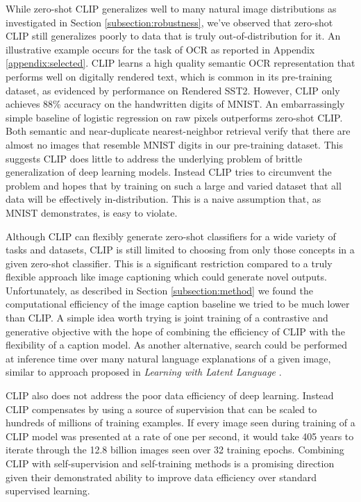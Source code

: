 While zero-shot CLIP generalizes well to many natural image distributions as investigated in Section \ref{subsection:robustness}, we've observed that zero-shot CLIP still generalizes poorly to data that is truly out-of-distribution for it. An illustrative example occurs for the task of OCR as reported in Appendix \ref{appendix:selected}. CLIP learns a high quality semantic OCR representation that performs well on digitally rendered text, which is common in its pre-training dataset, as evidenced by performance on Rendered SST2. However, CLIP only achieves 88\% accuracy on the handwritten digits of MNIST. An embarrassingly simple baseline of logistic regression on raw pixels outperforms zero-shot CLIP. Both semantic and near-duplicate nearest-neighbor retrieval verify that there are almost no images that resemble MNIST digits in our pre-training dataset. This suggests CLIP does little to address the underlying problem of brittle generalization of deep learning models. Instead CLIP tries to circumvent the problem and hopes that by training on such a large and varied dataset that all data will be effectively in-distribution. This is a naive assumption that, as MNIST demonstrates, is easy to violate.

Although CLIP can flexibly generate zero-shot classifiers for a wide variety of tasks and datasets, CLIP is still limited to choosing from only those concepts in a given zero-shot classifier. This is a significant restriction compared to a truly flexible approach like image captioning which could generate novel outputs. Unfortunately, as described in Section \ref{subsection:method} we found the computational efficiency of the image caption baseline we tried to be much lower than CLIP. A simple idea worth trying is joint training of a contrastive and generative objective with the hope of combining the efficiency of CLIP with the flexibility of a caption model. As another alternative, search could be performed at inference time over many natural language explanations of a given image, similar to approach proposed in \textit{Learning with Latent Language} \citet{andreas2017learning}.

CLIP also does not address the poor data efficiency of deep learning. Instead CLIP compensates by using a source of supervision that can be scaled to hundreds of millions of training examples. If every image seen during training of a CLIP model was presented at a rate of one per second, it would take 405 years to iterate through the 12.8 billion images seen over 32 training epochs. Combining CLIP with self-supervision \citep{henaff2020data,chen2020big} and self-training \citep{lee2013pseudo,xie2020self} methods is a promising direction given their demonstrated ability to improve data efficiency over standard supervised learning.

